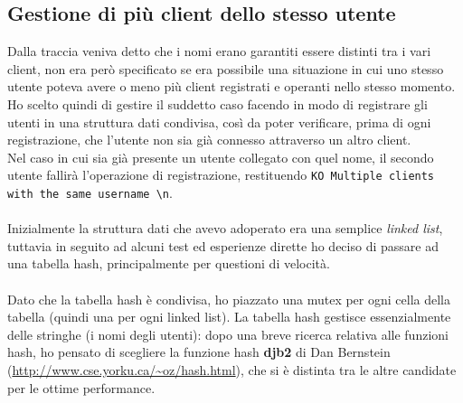 \subsection{Gestione di più client dello stesso utente}
\begin{flushleft}

Dalla traccia veniva detto che i nomi erano garantiti essere distinti tra i vari client, non era però specificato se era possibile una situazione in cui uno stesso utente poteva avere o meno più client registrati e operanti nello stesso momento.\\

Ho scelto quindi di gestire il suddetto caso facendo in modo di registrare gli utenti in una struttura dati condivisa, così da poter verificare, prima di ogni registrazione, che l'utente non sia già connesso attraverso un altro client.\\

Nel caso in cui sia già presente un utente collegato con quel nome, il secondo utente fallirà l'operazione di registrazione, restituendo \texttt{KO Multiple clients with the same username \textbackslash n}.\\~\\
Inizialmente la struttura dati che avevo adoperato era una semplice \emph{linked list}, tuttavia in seguito ad alcuni test ed esperienze dirette ho deciso di passare ad una tabella hash, principalmente per questioni di velocità. 
\\~\\
Dato che la tabella hash è condivisa, ho piazzato una mutex per ogni cella della tabella (quindi una per ogni linked list).
La tabella hash gestisce essenzialmente delle stringhe (i nomi degli utenti): dopo una breve ricerca relativa alle funzioni hash, ho pensato di scegliere la funzione hash \textbf{djb2} di Dan Bernstein (\url{http://www.cse.yorku.ca/~oz/hash.html}), che si è distinta tra le altre candidate per le ottime performance.
 

\end{flushleft}

\newpage

